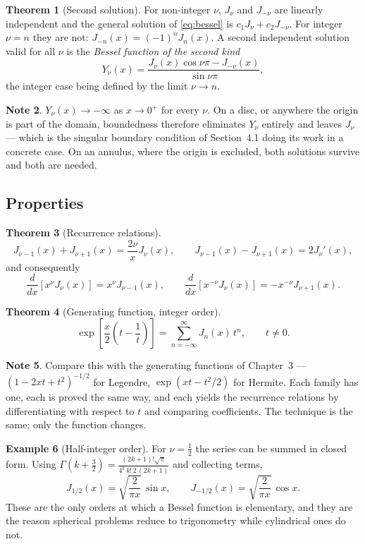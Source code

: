 \documentclass[12pt,a4paper]{report}
\theoremstyle{definition}
\newtheorem{thm}{Theorem}[section]
\newtheorem{exa}[thm]{Example}
\newtheorem{note}[thm]{Note}
\theoremstyle{plain}
\begin{document}
\begin{thm}[Second solution]
For non-integer $\nu$, $J_{\nu}$ and $J_{-\nu}$ are linearly independent and the
general solution of \eqref{eq:bessel} is $c_1J_{\nu}+c_2J_{-\nu}$. For integer
$\nu = n$ they are not: $J_{-n}(x) = (-1)^{n}J_{n}(x)$. A second independent
solution valid for all $\nu$ is the \emph{Bessel function of the second kind}
$$Y_{\nu}(x) = \frac{J_{\nu}(x)\cos\nu\pi - J_{-\nu}(x)}{\sin\nu\pi},$$
the integer case being defined by the limit $\nu\to n$.
\end{thm}

\begin{note}
$Y_{\nu}(x)\to-\infty$ as $x\to0^{+}$ for every $\nu$. On a disc, or anywhere
the origin is part of the domain, boundedness therefore eliminates $Y_{\nu}$
entirely and leaves $J_{\nu}$ --- which is the singular boundary condition of
Section~4.1 doing its work in a concrete case. On an annulus, where the origin
is excluded, both solutions survive and both are needed.
\end{note}

\subsection*{Properties}

\begin{thm}[Recurrence relations]
$$J_{\nu-1}(x)+J_{\nu+1}(x) = \frac{2\nu}{x}J_{\nu}(x),
\qquad
J_{\nu-1}(x)-J_{\nu+1}(x) = 2J_{\nu}'(x),$$
and consequently
$$\frac{d}{dx}\left[x^{\nu}J_{\nu}(x)\right] = x^{\nu}J_{\nu-1}(x),
\qquad
\frac{d}{dx}\left[x^{-\nu}J_{\nu}(x)\right] = -x^{-\nu}J_{\nu+1}(x).$$
\end{thm}

\begin{thm}[Generating function, integer order]
$$\exp\left[\frac{x}{2}\left(t-\frac{1}{t}\right)\right]
= \sum^{\infty}_{n=-\infty}J_{n}(x)\,t^{n},\qquad t\neq0 .$$
\end{thm}

\begin{note}
Compare this with the generating functions of Chapter~3 --- $(1-2xt+t^{2})^{-1/2}$
for Legendre, $\exp\left(xt-t^{2}/2\right)$ for Hermite. Each family has one,
each is proved the same way, and each yields the recurrence relations by
differentiating with respect to $t$ and comparing coefficients. The technique is
the same; only the function changes.
\end{note}

\begin{exa}[Half-integer order]
For $\nu = \tfrac12$ the series can be summed in closed form. Using
$\Gamma\left(k+\tfrac32\right)
= \frac{(2k+1)!\sqrt{\pi}}{4^{k}\,k!\,2\,(2k+1)}$ and collecting terms,
$$J_{1/2}(x) = \sqrt{\frac{2}{\pi x}}\,\sin x,
\qquad
J_{-1/2}(x) = \sqrt{\frac{2}{\pi x}}\,\cos x .$$
These are the only orders at which a Bessel function is elementary, and they are
the reason spherical problems reduce to trigonometry while cylindrical ones do
not.
\end{exa}
\end{document}
